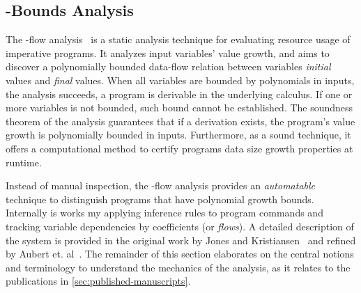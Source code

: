 \subsection{\mwp-Bounds Analysis}\label{subsec:mwp}

The \mwp-flow analysis~\cite{jones2009} is a static analysis technique for evaluating resource usage of imperative programs.
It analyzes input variables' value growth, and aims to discover a polynomially bounded data-flow relation between variables \emph{initial} values and \emph{final} values. 
When all variables are bounded by polynomials in inputs, the analysis succeeds, \ie a program is derivable in the underlying calculus.
If one or more variables is not bounded, such bound cannot be established.
The soundness theorem of the analysis guarantees that if a derivation exists, the program's value growth is polynomially bounded in inputs. Furthermore, as a sound technique, it offers a computational method to certify programs data size growth properties at runtime.



Instead of manual inspection, the \mwp-flow analysis provides an \emph{automatable} technique to distinguish programs that have polynomial growth bounds. 
Internally is works my applying inference rules to program commands and tracking variable dependencies by coefficients (or \emph{flows}).
A detailed description of the system is provided in the original work by Jones and Kristiansen~\cite{jones2009} and refined by Aubert et. al~\cite{aubert2022b}. The remainder of this section elaborates on the central notions and terminology to understand the mechanics of the analysis, as it relates to the publications in \autoref{sec:published-manuscripts}.


